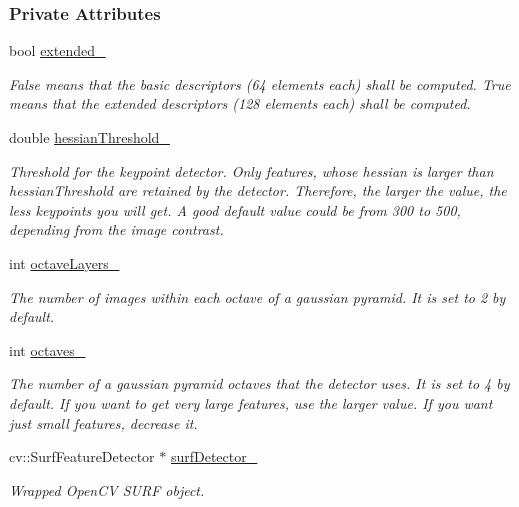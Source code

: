 \subsubsection*{Private Attributes}
\begin{DoxyCompactItemize}
\item 
bool \hyperlink{group___feature_extractor_a89c68527db49e286206062375b09c7bd}{extended\-\_\-}
\begin{DoxyCompactList}\small\item\em False means that the basic descriptors (64 elements each) shall be computed. True means that the extended descriptors (128 elements each) shall be computed. \end{DoxyCompactList}\item 
double \hyperlink{group___feature_extractor_a32db9f77d27527ff7c25824d954e30bc}{hessian\-Threshold\-\_\-}
\begin{DoxyCompactList}\small\item\em Threshold for the keypoint detector. Only features, whose hessian is larger than hessian\-Threshold are retained by the detector. Therefore, the larger the value, the less keypoints you will get. A good default value could be from 300 to 500, depending from the image contrast. \end{DoxyCompactList}\item 
int \hyperlink{group___feature_extractor_a1693fb1e68f90350c607c1e228743130}{octave\-Layers\-\_\-}
\begin{DoxyCompactList}\small\item\em The number of images within each octave of a gaussian pyramid. It is set to 2 by default. \end{DoxyCompactList}\item 
int \hyperlink{group___feature_extractor_a87f1c0c6c1c749b0736633da668c977b}{octaves\-\_\-}
\begin{DoxyCompactList}\small\item\em The number of a gaussian pyramid octaves that the detector uses. It is set to 4 by default. If you want to get very large features, use the larger value. If you want just small features, decrease it. \end{DoxyCompactList}\item 
cv\-::\-Surf\-Feature\-Detector $\ast$ \hyperlink{group___feature_extractor_a191dd9737bd6dc754e43912bb3aad219}{surf\-Detector\-\_\-}
\begin{DoxyCompactList}\small\item\em Wrapped Open\-C\-V S\-U\-R\-F object. \end{DoxyCompactList}\item 

\end{DoxyCompactItemize}
